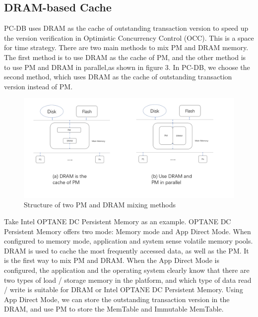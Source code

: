 \subsection{DRAM-based Cache}
PC-DB uses DRAM as the cache of outstanding transaction version to speed up the version verification in Optimistic Concurrency Control (OCC). This is a space for time strategy.
There are two main methods to mix PM and DRAM memory. The first method is to use DRAM as the cache of PM, and the other method is to use PM and DRAM in parallel,as shown in figure 3. In PC-DB, we choose the second method, which uses DRAM as the cache of outstanding transaction version instead of PM.
\begin{figure}
    \centering
    \includegraphics[width=0.36\paperwidth]{figure/PM_DRAM.png}
    \caption{Structure of two PM and DRAM mixing methods}
    \label{fig:throughput}
\end{figure}
Take Intel OPTANE DC Persistent Memory\cite{OPTANE} as an example. OPTANE DC Persistent Memory offers two mode: Memory mode and App Direct Mode. When configured to memory mode, application and system sense volatile memory pools. DRAM is used to cache the most frequently accessed data, as well as the PM. It is the first way to mix PM and DRAM. When the App Direct Mode is configured, the application and the operating system clearly know that there are two types of load / storage memory in the platform, and which type of data read / write is suitable for DRAM or Intel OPTANE DC Persistent Memory. Using App Direct Mode, we can store the outstanding transaction version in the DRAM, and use PM to store the MemTable and Immutable MemTable.

